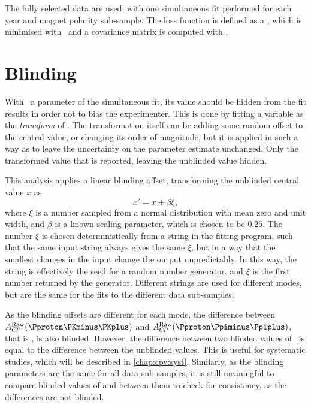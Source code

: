 The fully selected data are used, with one simultaneous fit performed for each 
year and magnet polarity sub-sample.
The loss function is defined as a \chisq, which is minimised with \minuit\ and 
a covariance matrix is computed with \hesse.

\section{Blinding}
\label{chap:cpv:araw:blinding}

With \ARaw\ a parameter of the simultaneous fit, its value should be hidden 
from the fit results in order not to bias the experimenter.
This is done by fitting a variable as the \emph{transform} of \ARaw.
The transformation itself can be adding some random offset to the central 
value, or changing its order of magnitude, but it is applied in such a way as 
to leave the uncertainty on the parameter estimate unchanged.
Only the transformed value that is reported, leaving the unblinded value 
hidden.

This analysis applies a linear blinding offset, transforming the unblinded 
central value $x$ as
\begin{equation}
  x' = x + \beta\xi,
\end{equation}
where $\xi$ is a number sampled from a normal distribution with mean zero and 
unit width, and $\beta$ is a known scaling parameter, which is chosen to be 
$0.25$.
The number $\xi$ is chosen deterministically from a string in the fitting 
program, such that the same input string always gives the same $\xi$, but in a 
way that the smallest changes in the input change the output unpredictably.
In this way, the string is effectively the seed for a random number generator, 
and $\xi$ is the first number returned by the generator.
Different strings are used for different modes, but are the same for the fits 
to the different data sub-samples.

As the blinding offsets are different for each mode, the difference between 
$\ARaw(\pKK)$ and $\ARaw(\ppipi)$, that is \dACP, is also blinded.
However, the difference between two blinded values of \dACP\ is equal to the 
difference between the unblinded values.
This is useful for systematic studies, which will be described in 
\cref{chap:cpv:syst}.
Similarly, as the blinding parameters are the same for all data sub-samples, it 
is still meaningful to compare blinded values of \ARaw and \dACP between them 
to check for consistency, as the differences are not blinded.

